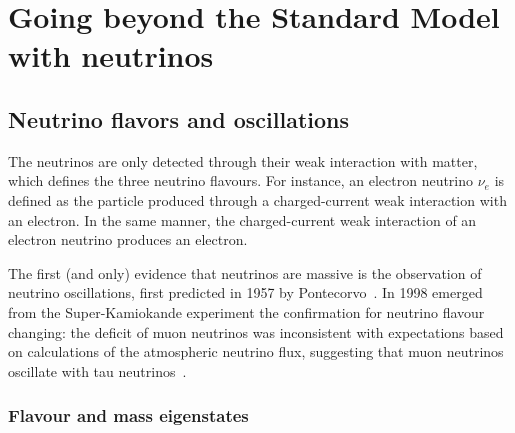 \section{Going beyond the Standard Model with neutrinos}
\subsection{Neutrino flavors and oscillations}

The neutrinos are only detected through their weak interaction with matter, which defines the three neutrino flavours.
For instance, an electron neutrino $\nu_e$ is defined as the particle produced through a charged-current weak interaction with an electron.
In the same manner, the charged-current weak interaction of an electron neutrino produces an electron.

The first (and only) evidence that neutrinos are massive is the observation of neutrino oscillations, first predicted in 1957 by Pontecorvo~\cite{art:pontecorvo_1958}.
In 1998 emerged from the Super-Kamiokande experiment the confirmation for neutrino flavour changing: the deficit of muon neutrinos was inconsistent with expectations based on calculations of the atmospheric neutrino flux, suggesting that muon neutrinos oscillate with tau neutrinos~\cite{art:kamiokande_1998}.

\subsubsection*{Flavour and mass eigenstates}


